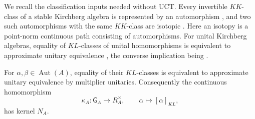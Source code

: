 We recall the classification inputs needed without UCT. Every invertible $KK$-class of a stable Kirchberg algebra is represented by an automorphism \cite[Theorem 4.2.1]{Phillips2000}, and two such automorphisms with the same $KK$-class are isotopic \cite[Theorem 4.1.4(2)]{Phillips2000}. Here an isotopy is a
point-norm continuous path consisting of automorphisms. For unital Kirchberg
algebras, equality of $KL$-classes of unital homomorphisms is equivalent to
approximate unitary equivalence \cite[Theorem~5.1(a)]{Dadarlat2005}, the
converse implication being \cite[Theorem~3.3]{Dadarlat2005}.

\begin{lemma}\label{lem:st-stable-kl-uniqueness}
 For $\alpha,\beta\in\operatorname{Aut}(A)$, equality of
their $KL$-classes is equivalent to approximate unitary equivalence by
multiplier unitaries. Consequently the continuous homomorphism 
\begin{equation*}
\kappa_A:\mathsf G_A\longrightarrow R_A^\times,\qquad  \alpha\longmapsto[\alpha]_{KL}, 
\end{equation*}
has kernel $N_A$.
\end{lemma}

